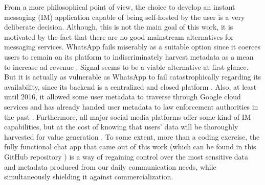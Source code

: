 From a more philosophical point of view, the choice to develop an instant messaging (IM) application capable of being self-hosted by the user is a very deliberate decision. Although, this is not the main goal of this work, it is motivated by the fact that there are no good mainstream alternatives for messaging services. WhatsApp fails miserably as a suitable option since it coerces users to remain on its platform to indiscriminately harvest metadata as a mean to increase ad revenue \cite{Kumar2021}. Signal seems to be a viable alternative at first glance. But it is actually as vulnerable as WhatsApp to fail catastrophically regarding its availability, since its backend is a centralized and closed platform \cite{Hodgson2020}. Also, at least until 2016, it allowed some user metadata to traverse through Google cloud services \cite{Edge2016} and has already handed user metadata to law enforcement authorities in the past \cite{Kaufman2016}. Furthermore, all major social media platforms offer some kind of IM capabilities, but at the cost of knowing that users' data will be thoroughly harvested for value generation \cite{socialmedia2017}. To some extent, more than a coding exercise, the fully functional chat app that came out of this work (which can be found in this GitHub repository \cite{Rodriguez2022}) is a way of regaining control over the most sensitive data and metadata produced from our daily communication needs, while simultaneously shielding it against commercialization.